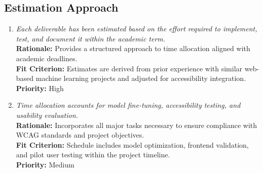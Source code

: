 \documentclass[12pt]{article}
\begin{document}
\subsection{Estimation Approach}
\begin{enumerate}[label=C-EA \arabic*., wide=0pt, leftmargin=*]
\item \emph{Each deliverable has been estimated based on the effort required to implement, test, and document it within the academic term.}\\[2mm] 
    {\bf Rationale:} Provides a structured approach to time allocation aligned with academic deadlines.\\
    {\bf Fit Criterion:} Estimates are derived from prior experience with similar web-based machine learning projects and adjusted for accessibility integration.\\
    {\bf Priority:} High

\item \emph{Time allocation accounts for model fine-tuning, accessibility testing, and usability evaluation.}\\[2mm] 
    {\bf Rationale:} Incorporates all major tasks necessary to ensure compliance with WCAG standards and project objectives.\\
    {\bf Fit Criterion:} Schedule includes model optimization, frontend validation, and pilot user testing within the project timeline.\\
    {\bf Priority:} Medium
\end{enumerate}
\end{document}
